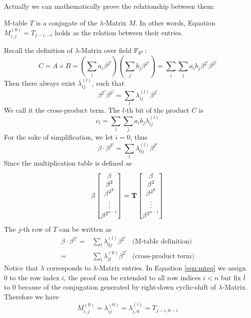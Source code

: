 Actually we can mathematically prove the relationship 
between them:
\begin{Theorem}
M-table $T$ is a conjugate of the $\lambda$-Matrix $M$. In other words,
Equation $M_{i,j}^{(0)} = T_{j-i,-i}$ holds as the relation between their entries.
\end{Theorem}
\begin{Proof}
Recall the definition of $\lambda$-Matrix over field ${\mathbb{F}}_{2^k}$:
$$C = A\times B = \left(\sum_i a_i\beta^{2^i}\right)\left(\sum_jb_j\beta^{2^j}\right) = \sum_i\sum_ja_ib_j\beta^{2^i}\beta^{2^j}$$
Then there always exist $\lambda_{ij}^{(l)}$, such that 
$$\beta^{2^i}\beta^{2^j} = \sum_l\lambda_{ij}^{(l)}\beta^{2^l}$$
We call it the cross-product term. The $l$-th bit of the product $C$ is
$$c_l = \sum_i\sum_ja_ib_j\lambda_{ij}^{(l)}$$
For the sake of simplification, we let $i=0$, thus 
$$\beta\cdot\beta^{2^j} = \sum_l\lambda_{0j}^{(l)}\beta^{2^l}$$
Since the multiplication table is defined as
\begin{equation}
\beta
\begin{bmatrix}
\beta \\ \beta^2 \\ \beta^{2^2} \\ \vdots \\ \beta^{2^{n-1}}
\end{bmatrix}
= {\bf T}
\begin{bmatrix}
\beta \\ \beta^2 \\ \beta^{2^2} \\ \vdots \\ \beta^{2^{n-1}}
\end{bmatrix}
\end{equation}
The $j$-th row of $T$ can be written as
\begin{align}
\beta\cdot\beta^{2^j} =& \sum_l\lambda_{0j}^{(l)}\beta^{2^l} & \text{(M-table definition)} \nonumber\\
					=& \sum_l\lambda_{jl}^{(0)}\beta^{2^l} & \text{(cross-product term)} \label{eqn:mteq}
\end{align}
Notice that $\lambda$ corresponds to $\lambda$-Matrix entries. In Equation \ref{eqn:mteq} we assign $0$ to the 
row index $i$, the proof can be extended to all row indices $i<n$ but fix $l$ to 0 because of the 
conjugation generated by right-down cyclic-shift of $\lambda$-Matrix. Therefore we have 
$$M_{i,j}^{(0)} = \lambda_{ij}^{(0)} = \lambda_{j,0}^{(i)} = T_{j-i,0-i}$$
\end{Proof}
